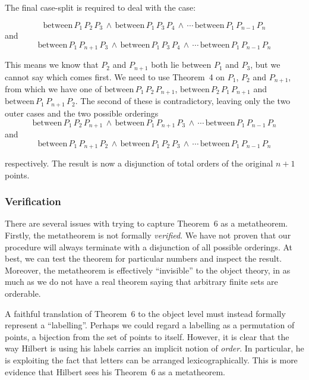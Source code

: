 \documentclass{article}
\newcommand{\between}[3]{\text{between}\,#1\,#2\,#3}
\begin{document}
The final case-split is required to deal with the case:

\begin{displaymath}
\between{P_1}{P_2}{P_3}\,\wedge\,\between{P_1}{P_3}{P_4}\,\wedge\,\cdots\,\between{P_1}{P_{n-1}}{P_n}
\end{displaymath}
and
\begin{displaymath}
\between{P_1}{P_{n+1}}{P_3}\,\wedge\,\between{P_1}{P_3}{P_4}\,\wedge\,\cdots\,\between{P_1}{P_{n-1}}{P_n}
\end{displaymath}

This means we know that $P_2$ and $P_{n+1}$ both lie between $P_1$ and $P_3$, but we cannot say which comes first. We need to use Theorem~4 on $P_1$, $P_2$ and $P_{n+1}$, from which we have one of $\between{P_1}{P_2}{P_{n+1}}$, $\between{P_2}{P_1}{P_{n+1}}$ and $\between{P_1}{P_{n+1}}{P_2}$. The second of these is contradictory, leaving only the two outer cases and the two possible orderings
\begin{displaymath}
\between{P_1}{P_2}{P_{n+1}} \,\wedge\,\between{P_1}{P_{n+1}}{P_3}\,\wedge\,\cdots\,\between{P_1}{P_{n-1}}{P_n}
\end{displaymath}
and
\begin{displaymath}
\between{P_1}{P_{n+1}}{P_2}\,\wedge\,\between{P_1}{P_2}{P_3}\,\wedge\,\cdots\,\between{P_1}{P_{n-1}}{P_n}
\end{displaymath}

respectively. The result is now a disjunction of total orders of the original $n+1$ points.

\subsubsection{Verification}
There are several issues with trying to capture Theorem~6 as a metatheorem. Firstly, the metatheorem is not formally \emph{verified}. We have not proven that our procedure will always terminate with a disjunction of all possible orderings. At best, we can test the theorem for particular numbers and inspect the result. Moreover, the metatheorem is effectively ``invisible'' to the object theory, in as much as we do not have a real theorem saying that arbitrary finite sets are orderable. 

A faithful translation of Theorem~6 to the object level must instead formally represent a ``labelling''. Perhaps we could regard a labelling as a permutation of points, a bijection from the set of points to itself. However, it is clear that the way Hilbert is using his labels carries an implicit notion of \emph{order}. In particular, he is exploiting the fact that letters can be arranged lexicographically. This is more evidence that Hilbert sees his Theorem~6 as a metatheorem.
\end{document}

